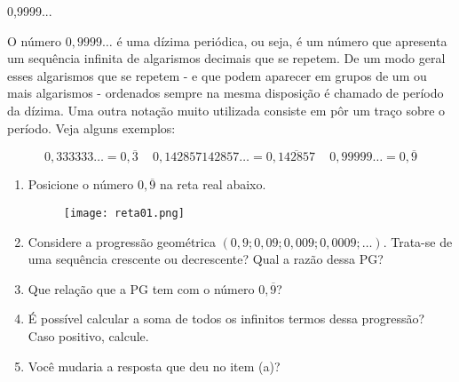 \begin{task}{0,9999...}

O número $0,9999\ldots$ é uma dízima periódica, ou seja, é um número que apresenta um sequência infinita de algarismos decimais que se repetem. De um modo geral esses algarismos que se repetem - e que podem aparecer em grupos de um ou mais algarismos - ordenados sempre na mesma disposição é chamado de período da dízima. Uma outra notação muito utilizada consiste em pôr um traço sobre o período. Veja alguns exemplos:

\[
0{,}333333\ldots = 0,\overline{3} \,\ \,\ \,\   0{,}142857142857\ldots = 0{,}\overline{142857} \,\ \,\ \,\ 0{,}99999\ldots = 0{,}\overline{9}
\]

\begin{enumerate}

\item{}
Posicione o número $0,\overline{9}$ na reta real abaixo.

\begin{figure}[H]
\centering
\texttt{[image: reta01.png]}
\end{figure}

\item{}
Considere a progressão geométrica $(0{,}9; 0{,}09; 0{,}009; 0{,}0009; \ldots )$. Trata-se de uma sequência crescente ou decrescente? Qual a razão dessa PG?

\item{}
Que relação que a PG tem com o número $0,\overline{9}$?

\item{}
É possível calcular a soma de todos os infinitos termos dessa progressão? Caso positivo, calcule.

\item{}
Você mudaria a resposta que deu no item (a)?

\end{enumerate}

\end{task}


